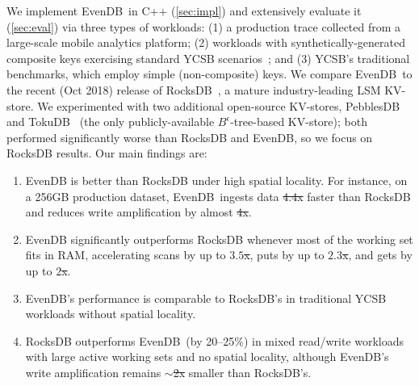 \documentclass[sigplan,10pt]{acmart}
\newcommand{\inred}[1]{{\color{red}{#1}}}
\newcommand{\sys}{EvenDB}
\providecommand{\DIFadd}[1]{{\protect\color{blue}\uwave{#1}}} %
\providecommand{\DIFdel}[1]{{\protect\color{red}\sout{#1}}}                      %
\providecommand{\DIFaddbegin}{} %
\providecommand{\DIFaddend}{} %
\providecommand{\DIFdelbegin}{} %
\providecommand{\DIFdelend}{} %
\begin{document}
We implement \sys\ in  C++ (\cref{sec:impl}) and extensively evaluate it (\cref{sec:eval})
via three types of workloads: (1) a production trace collected from a large-scale mobile analytics platform; 
(2)  workloads with synthetically-generated composite keys exercising  standard YCSB scenarios~\cite{YCSB};
and (3)  YCSB's traditional benchmarks, which employ simple (non-composite) keys.  
We compare \sys\ to the recent (Oct 2018) release of RocksDB~\cite{RocksDB}, a mature industry-leading LSM KV-store. 
We  experimented with two additional open-source KV-stores, PebblesDB~\cite{PebblesDB}  and  
TokuDB~\cite{TokuDB} (the only publicly-available $B^{\epsilon}$-tree-based 
KV-store); both performed significantly worse than  RocksDB and \sys, so we focus on RocksDB results. 
Our main findings are: 
\begin{enumerate} 
\item \sys\/ is  better than RocksDB under high spatial  locality.  
For instance, on a 256GB production dataset, \sys\ ingests data \DIFdelbegin \DIFdel{4.4x }\DIFdelend \DIFaddbegin \DIFadd{$4.4\times$ }\DIFaddend faster than RocksDB %
and reduces write amplification by almost \DIFdelbegin \DIFdel{4x}\DIFdelend \DIFaddbegin \DIFadd{$4\times$}\DIFaddend . 
\item \sys\/ significantly outperforms RocksDB whenever most of the working set fits in RAM, 
accelerating scans by up to \DIFdelbegin \DIFdel{$3.5$x}\DIFdelend \DIFaddbegin \DIFadd{$3.5\times$}\DIFaddend , puts by up to \DIFdelbegin \DIFdel{$2.3$x}\DIFdelend \DIFaddbegin \DIFadd{$2.3\times$}\DIFaddend , and gets by up to \DIFdelbegin \DIFdel{$2$x}\DIFdelend \DIFaddbegin \DIFadd{$2\times$}\DIFaddend . 
\item \sys's performance is  comparable to RocksDB's in traditional YCSB workloads without spatial locality.
\item RocksDB outperforms \sys\ (by 20--25\%)  in mixed read/write workloads with large active working sets and no spatial locality, 
although \sys's write amplification remains \DIFdelbegin \DIFdel{$\sim$2x }\DIFdelend \DIFaddbegin \DIFadd{$\sim2\times$ }\DIFaddend smaller than RocksDB's. 
\end{enumerate}
\end{document}
